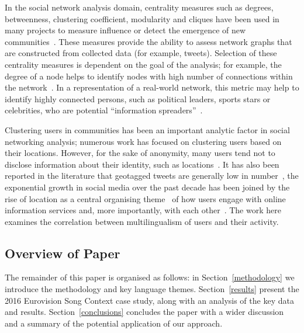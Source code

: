 \documentclass{llncs}
\begin{document}
In the social network analysis domain, centrality measures such as 
degrees, betweenness, clustering coefficient, modularity and cliques 
have been used in many projects to measure influence or detect the 
emergence of new communities~\cite{willis-et-al:2015,oatley+crick:2015}.
These measures provide the ability to assess network graphs that are 
constructed from collected data (for example, tweets). Selection of these 
centrality measures is dependent on the goal of the analysis; for example, the
degree of a node helps to identify nodes with high number of connections
within the network~\cite{borgatti+everett:2000,rombach-et-al:2014,liu-et-al:2014}.
In a representation of a real-world network, this metric may help to
identify highly connected persons, such as political leaders, sports
stars or celebrities, who are potential ``information
spreaders''~\cite{cha-et-al:2012,borge-holthoefer-et-al:2012,zhang-et-al:2016}.

Clustering users in communities has been an important analytic factor
in social networking analysis; numerous work has focused on clustering
users based on their locations. However, for the sake of anonymity,
many users tend not to disclose information about their identity, such
as locations~\cite{kang-et-al:2013}. It has also been reported in the
literature that geotagged tweets are generally low in
number~\cite{morstatter-et-al:2013,tan-et-al:2013,kumar-et-al:2014},
the exponential growth in social media over the past decade has been
joined by the rise of location as a central organising
theme~\cite{liang-et-al:2013} of how users engage with online
information services and, more importantly, with each
other~\cite{cheng-et-al:2010,caverlee-et-al:2013}. The work here 
examines the correlation between multilingualism of users and their 
activity.


\subsection{Overview of Paper}

The remainder of this paper is organised as follows: in
Section~\ref{methodology} we introduce the methodology and key
language themes.  Section~\ref{results} present the 2016
Eurovision Song Context case study, along with an analysis of the key
data and results. Section~\ref{conclusions} concludes the paper with a
wider discussion and a summary of the potential application of our
approach.
\end{document}
